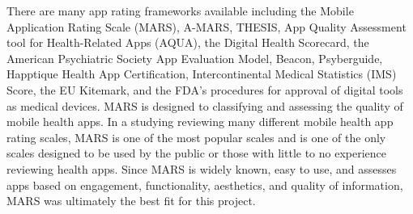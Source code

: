 There are many app rating frameworks available including the Mobile Application Rating Scale (MARS), A-MARS, THESIS, App Quality Assessment tool for Health-Related Apps (AQUA), the Digital Health Scorecard, the American Psychiatric Society App Evaluation Model, Beacon, Psyberguide, Happtique Health App Certification, Intercontinental Medical Statistics (IMS) Score, the EU Kitemark, and the FDA’s procedures for approval of digital tools as medical devices\cite{Morley2024}. MARS is designed to classifying and assessing the quality of mobile health apps\cite{Stoyanov2015}. In a studying reviewing many different mobile health app rating scales, MARS is one of the most popular scales and is one of the only scales designed to be used by the public or those with little to no experience reviewing health apps\cite{AzadKhaneghah2020}. Since MARS is widely known, easy to use, and assesses apps based on engagement, functionality, aesthetics, and quality of information, MARS was ultimately the best fit for this project.


